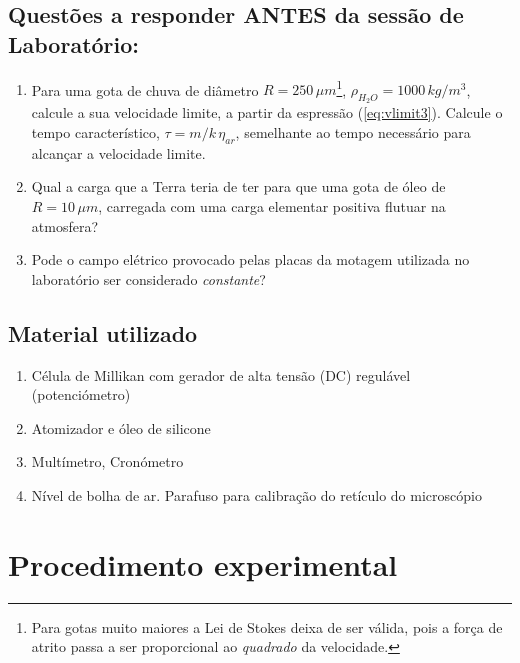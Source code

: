 \documentclass[a4paper,twoside,12pt]{article}      %
\begin{document}
\subsection{\sf Questões a responder ANTES da sessão de Laboratório:}
\begin{enumerate}
\item Para uma gota de chuva de diâmetro $R = 250\,\mu m$\footnote{Para gotas muito maiores a Lei de Stokes deixa de ser válida, pois a força de atrito passa a ser proporcional ao \emph{quadrado} da velocidade.}, $\rho_{H_2 O} = 1000 \, kg/m^{3}$, calcule a sua velocidade limite, a partir da espressão (\ref{eq:vlimit3}). Calcule o tempo característico, $\tau=m/k\,\eta_{ar}$, semelhante ao tempo necessário para alcançar a velocidade limite.
\item Qual a carga que a Terra teria de ter para que uma gota de óleo de $R = 10\,\mu m$, carregada com uma carga elementar positiva flutuar na atmosfera?
\item Pode o campo elétrico provocado pelas placas da motagem utilizada no laboratório ser considerado \emph{constante}?
\end{enumerate}

\subsection{\sf Material utilizado}

\begin{enumerate}
	\item Célula de Millikan com gerador de alta tensão (DC) regulável (potenciómetro) 
	\item  Atomizador e óleo de silicone 
	\item Multímetro, Cronómetro 
	\item Nível de bolha de ar. Parafuso para calibração do retículo do microscópio
\end{enumerate}
\section{\sf Procedimento experimental}
\end{document}

